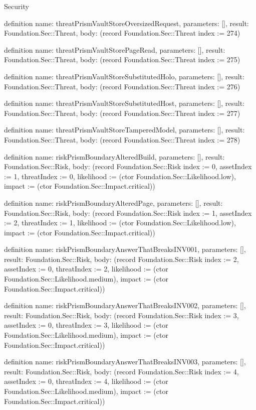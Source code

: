 \begin{lexlean}{Security}
\begin{semanticmodule}
definition{
  name: threatPrismVaultStoreOversizedRequest,
  parameters: [],
  result: Foundation.Sec::Threat,
  body: (record Foundation.Sec::Threat {index := 274})
}

definition{
  name: threatPrismVaultStorePageRead,
  parameters: [],
  result: Foundation.Sec::Threat,
  body: (record Foundation.Sec::Threat {index := 275})
}

definition{
  name: threatPrismVaultStoreSubstitutedHolo,
  parameters: [],
  result: Foundation.Sec::Threat,
  body: (record Foundation.Sec::Threat {index := 276})
}

definition{
  name: threatPrismVaultStoreSubstitutedHost,
  parameters: [],
  result: Foundation.Sec::Threat,
  body: (record Foundation.Sec::Threat {index := 277})
}

definition{
  name: threatPrismVaultStoreTamperedModel,
  parameters: [],
  result: Foundation.Sec::Threat,
  body: (record Foundation.Sec::Threat {index := 278})
}

definition{
  name: riskPrismBoundaryAlteredBuild,
  parameters: [],
  result: Foundation.Sec::Risk,
  body: (record Foundation.Sec::Risk {index := 0, assetIndex := 1, threatIndex := 0, likelihood := (ctor Foundation.Sec::Likelihood.low), impact := (ctor Foundation.Sec::Impact.critical)})
}

definition{
  name: riskPrismBoundaryAlteredPage,
  parameters: [],
  result: Foundation.Sec::Risk,
  body: (record Foundation.Sec::Risk {index := 1, assetIndex := 2, threatIndex := 1, likelihood := (ctor Foundation.Sec::Likelihood.low), impact := (ctor Foundation.Sec::Impact.critical)})
}

definition{
  name: riskPrismBoundaryAnswerThatBreaksINV001,
  parameters: [],
  result: Foundation.Sec::Risk,
  body: (record Foundation.Sec::Risk {index := 2, assetIndex := 0, threatIndex := 2, likelihood := (ctor Foundation.Sec::Likelihood.medium), impact := (ctor Foundation.Sec::Impact.critical)})
}

definition{
  name: riskPrismBoundaryAnswerThatBreaksINV002,
  parameters: [],
  result: Foundation.Sec::Risk,
  body: (record Foundation.Sec::Risk {index := 3, assetIndex := 0, threatIndex := 3, likelihood := (ctor Foundation.Sec::Likelihood.medium), impact := (ctor Foundation.Sec::Impact.critical)})
}

definition{
  name: riskPrismBoundaryAnswerThatBreaksINV003,
  parameters: [],
  result: Foundation.Sec::Risk,
  body: (record Foundation.Sec::Risk {index := 4, assetIndex := 0, threatIndex := 4, likelihood := (ctor Foundation.Sec::Likelihood.medium), impact := (ctor Foundation.Sec::Impact.critical)})
}


\end{semanticmodule}
\end{lexlean}
